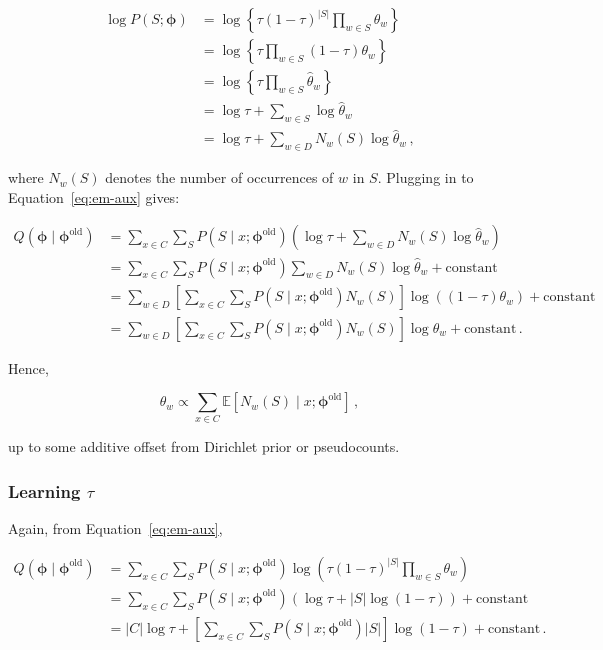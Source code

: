 \documentclass{article}
\begin{document}
\[
    \begin{aligned}
        \log P(S; \boldsymbol\phi)
        &= \log\left\{\tau (1-\tau)^{|S|} \prod_{w \in S} \theta_w\right\}\\
        &= \log\left\{\tau \prod_{w \in S} (1-\tau) \theta_w\right\}\\
        &= \log\left\{\tau \prod_{w \in S} \hat{\theta}_w\right\}\\
        &= \log\tau + \sum_{w \in S} \log \hat{\theta}_w\\
        &= \log\tau + \sum_{w \in D} N_w(S) \log \hat{\theta}_w\,,
    \end{aligned}
\]

\noindent
where $N_w(S)$ denotes the number of occurrences of $w$ in $S$.
Plugging in to Equation~\eqref{eq:em-aux} gives:

\[
    \begin{aligned}
        Q(\boldsymbol\phi \mid \boldsymbol\phi^\mathrm{old})
        &= \sum_{x \in C} \sum_S P(S \mid x; \boldsymbol\phi^\mathrm{old})\left(\log\tau + \sum_{w \in D} N_w(S) \log \hat{\theta}_w\right)\\
        &= \sum_{x \in C}\sum_S P(S \mid x; \boldsymbol\phi^\mathrm{old}) \sum_{w \in D} N_w(S) \log \hat{\theta}_w + \text{constant}\\
        &= \sum_{w \in D} \left[\sum_{x \in C} \sum_S P(S \mid x; \boldsymbol\phi^\mathrm{old}) N_w(S)\right] \log ((1-\tau) \theta_w) + \text{constant}\\
        &= \sum_{w \in D} \left[\sum_{x \in C} \sum_S P(S \mid x; \boldsymbol\phi^\mathrm{old}) N_w(S)\right] \log \theta_w + \text{constant}\,.
    \end{aligned}
\]

\noindent
Hence,

\[
    \theta_w \propto \sum_{x \in C} \mathbb{E}[N_w(S) \mid x; \boldsymbol\phi^\mathrm{old}]\,,
\]

\noindent
up to some additive offset from Dirichlet prior or pseudocounts.

\subsubsection{Learning \texorpdfstring{$\tau$}{tau}}
Again, from Equation~\eqref{eq:em-aux},

\[
    \begin{aligned}
        Q(\boldsymbol\phi \mid \boldsymbol\phi^\mathrm{old})
        &= \sum_{x \in C} \sum_S P(S \mid x; \boldsymbol\phi^\mathrm{old}) \log \left(\tau (1-\tau)^{|S|} \prod_{w \in S} \theta_w\right)\\
        &= \sum_{x \in C} \sum_S P(S \mid x; \boldsymbol\phi^\mathrm{old}) (\log\tau + |S| \log(1-\tau)) + \text{constant}\\
        &= |C| \log\tau + \left[\sum_{x \in C} \sum_S P(S \mid x; \boldsymbol\phi^\mathrm{old}) |S|\right] \log(1-\tau) + \text{constant}\,.
    \end{aligned}
\]
\end{document}
